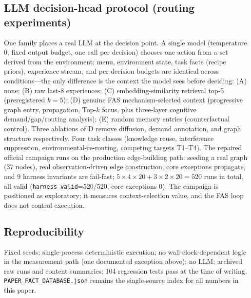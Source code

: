 \documentclass[10pt,a4paper]{article}
\begin{document}
\subsection{LLM decision-head protocol (routing experiments)}
\label{sec:method-routing}
One family places a real LLM at the decision point. A single model (temperature 0, fixed output budget, one call per decision) chooses one action from a set derived from the environment; menu, environment state, task facts (recipe priors), experience stream, and per-decision budgets are identical across conditions---the only difference is the context the model sees before deciding: (A) none; (B) raw last-8 experiences; (C) embedding-similarity retrieval top-5 (preregistered $k{=}5$); (D) genuine FAS mechanism-selected context (progressive graph entry, propagation, Top-$k$ focus, plus three-layer cognitive demand/gap/routing analysis); (E) random memory entries (counterfactual control). Three ablations of D remove diffusion, demand annotation, and graph structure respectively. Four task classes (knowledge reuse, interference suppression, environmental-re-routing, competing targets T1--T4). The repaired official campaign runs on the production edge-building path: seeding a real graph (37 nodes), real observation-driven edge construction, core exceptions propagate, and 9 harness invariants are fail-fast; $5\times4\times20+3\times2\times20=520$ runs in total, all valid (\texttt{harness\_valid}=520/520, core exceptions 0). The campaign is positioned as exploratory; it measures context-selection value, and the FAS loop does not control execution.

\subsection{Reproducibility}
Fixed seeds; single-process deterministic execution; no wall-clock-dependent logic in the measurement path (one documented exception above); no LLM; archived raw runs and content summaries; 104 regression tests pass at the time of writing. \texttt{PAPER\_FACT\_DATABASE.json} remains the single-source index for all numbers in this paper.
\end{document}
